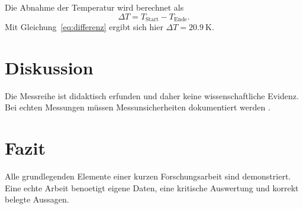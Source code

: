 \documentclass[11pt,a4paper]{scrartcl}
\begin{document}
Die Abnahme der Temperatur wird berechnet als
\begin{equation}\label{eq:differenz}
  \Delta T = T_{\mathrm{Start}} - T_{\mathrm{Ende}}.
\end{equation}
Mit Gleichung~\eqref{eq:differenz} ergibt sich hier
\(\Delta T = \qty{20.9}{\kelvin}\).

\section{Diskussion}
Die Messreihe ist didaktisch erfunden und daher keine
wissenschaftliche Evidenz. Bei echten Messungen müssen
Messunsicherheiten dokumentiert werden \parencite{jcgm2008}.

\section{Fazit}
Alle grundlegenden Elemente einer kurzen Forschungsarbeit
sind demonstriert. Eine echte Arbeit benoetigt eigene Daten,
eine kritische Auswertung und korrekt belegte Aussagen.

\printbibliography[heading=bibintoc,title={Quellenverzeichnis}]
\appendix

\end{document}
